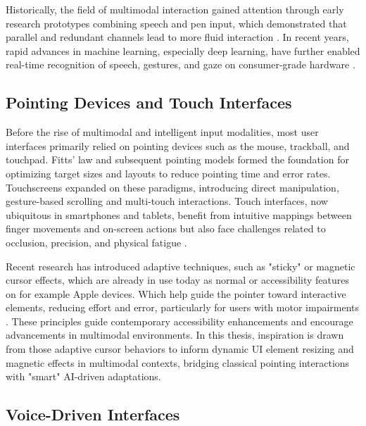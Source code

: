 \documentclass[openany]{book}
\begin{document}

Historically, the field of multimodal interaction gained attention through early research prototypes combining speech and pen input, which demonstrated that parallel and redundant channels lead to more fluid interaction \cite{Oviatt1999, Oviatt2004}. In recent years, rapid advances in machine learning, especially deep learning, have further enabled real-time recognition of speech, gestures, and gaze on consumer-grade hardware \cite{lugaresi2019mediapipeframeworkbuildingperception, Choudhury2015}.

\subsection{Pointing Devices and Touch Interfaces}
Before the rise of multimodal and intelligent input modalities, most user interfaces primarily relied on pointing devices such as the mouse, trackball, and touchpad. Fitts' law \cite{Fitts1954} and subsequent pointing models formed the foundation for optimizing target sizes and layouts to reduce pointing time and error rates.  
Touchscreens expanded on these paradigms, introducing direct manipulation, gesture-based scrolling and multi-touch interactions. Touch interfaces, now ubiquitous in smartphones and tablets, benefit from intuitive mappings between finger movements and on-screen actions but also face challenges related to occlusion, precision, and physical fatigue \cite{Wigdor2011BraveNUI}.

Recent research has introduced adaptive techniques, such as "sticky" or magnetic cursor effects, which are already in use today as normal or accessibility features on for example Apple devices. Which help guide the pointer toward interactive elements, reducing effort and error, particularly for users with motor impairments \cite{Cockburn2008Sticky}. These principles guide contemporary accessibility enhancements and encourage advancements in multimodal environments.
In this thesis, inspiration is drawn from those adaptive cursor behaviors to inform dynamic UI element resizing and magnetic effects in multimodal contexts, bridging classical pointing interactions with "smart" AI-driven adaptations.

\subsection{Voice-Driven Interfaces}
\end{document}
